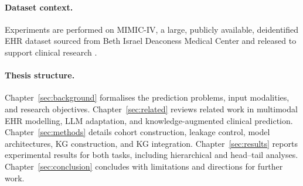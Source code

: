 \paragraph{Dataset context.}
Experiments are performed on MIMIC-IV, a large, publicly available, deidentified EHR dataset sourced from Beth Israel Deaconess Medical Center and released to support clinical research \cite{johnson2023mimiciv}.

\paragraph{Thesis structure.}
Chapter~\ref{sec:background} formalises the prediction problems, input modalities, and research objectives.
Chapter~\ref{sec:related} reviews related work in multimodal EHR modelling, LLM adaptation, and knowledge-augmented clinical prediction.
Chapter~\ref{sec:methods} details cohort construction, leakage control, model architectures, KG construction, and KG integration.
Chapter~\ref{sec:results} reports experimental results for both tasks, including hierarchical and head--tail analyses.
Chapter~\ref{sec:conclusion} concludes with limitations and directions for further work.









